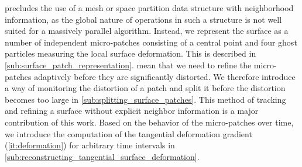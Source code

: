 %
 precludes the use of a mesh or space partition data
structure with neighborhood information, as the global nature of operations in
such a structure is not well suited for a massively parallel algorithm.
%
Instead, we represent the surface as a number of independent micro-patches
consisting of a central point and four ghost particles measuring the local
surface deformation.
%
This is described in \cref{sub:surface_patch_representation}.
%
 mean that we need to refine
the micro-patches adaptively before they are significantly distorted.
%
We therefore introduce a way of monitoring the distortion of a patch and split
it before the distortion becomes too large in
\cref{sub:splitting_surface_patches}.
%
This method of tracking and refining a surface without explicit neighbor
information is a major contribution of this work.
%
Based on the behavior of the micro-patches over time, we introduce the
computation of the tangential deformation gradient (\cref{it:deformation})
for arbitrary time intervals in
\cref{sub:reconstructing_tangential_surface_deformation}.
%
